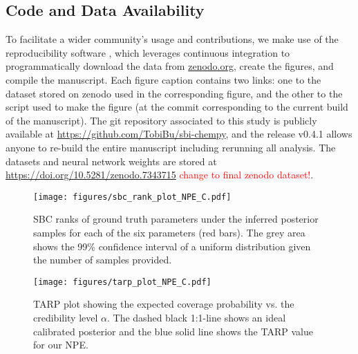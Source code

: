 \documentclass{aa}
\begin{document}
\begin{appendix}

\section{Code and Data Availability}
\label{sec:appendix_code_and_data}

To facilitate a wider community's usage and contributions, we make use of the reproducibility software
\href{https://github.com/showyourwork/showyourwork}{\showyourwork}
\citep{Luger2021}, which leverages continuous integration to
programmatically download the data from
\href{https://zenodo.org/}{zenodo.org}, create the figures, and
compile the manuscript. Each figure caption contains two links: one
to the dataset stored on zenodo used in the corresponding figure,
and the other to the script used to make the figure (at the commit
corresponding to the current build of the manuscript). The git
repository associated to this study is publicly available at
\url{https://github.com/TobiBu/sbi-chempy}, and the release
v0.4.1 allows anyone to re-build the entire manuscript including rerunning all analysis. The datasets and neural network weights are stored at \url{https://doi.org/10.5281/zenodo.7343715} \textcolor{red}{change to final zenodo dataset!}.

\begin{figure*}[]
     \centering
     \texttt{[image: figures/sbc\_rank\_plot\_NPE\_C.pdf]}
     \caption{SBC ranks of ground truth parameters under the inferred posterior samples for each of the six parameters (red bars). The grey area shows the 99\% confidence interval of a uniform distribution given the number of samples provided.}
     \label{fig:sbc}
\end{figure*}

\begin{figure}[]
     \centering
     \texttt{[image: figures/tarp\_plot\_NPE\_C.pdf]}
     \caption{TARP plot showing the expected coverage probability vs. the credibility level $\alpha$. The dashed black 1:1-line shows an ideal calibrated posterior and the blue solid line shows the TARP value for our NPE.}
     \label{fig:tarp}
\end{figure}



\end{appendix}
\end{document}
